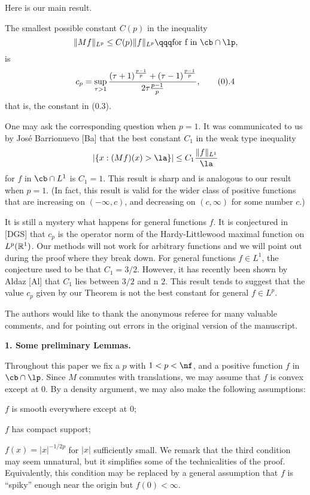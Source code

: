 Here is our main result.

The smallest possible constant $C(p)$ in the inequality
 $$
\|Mf\|_{L^p} \le C(p) \|f\|_{L^p}\qqq \text{for
f in $\cb \cap \lp$},
$$
is
$$
c_p=\sup_{\tau >1} {(\tau +1)^{p-1\over p} + (\tau -1)^{p-1\over p} \over
2\tau {p-1\over p}},\tag0.4
$$
that is, the constant in (0.3).
\endproclaim


One may ask the corresponding question when $p=1$. 
It was communicated to us by Jos\'e  Barrionuevo [Ba] that
the best constant $C_1$ in the weak type inequality
$$
|\{x: (Mf)(x)>\la \}|    \le C_1 { \|f\|_{L^1} \over \la }
$$
for $f$ in   $\cb \cap L^1$ is $C_1=1$. This result is sharp and is
analogous to our result when $p=1$. 
(In fact, this result is valid for the wider class of
positive functions that are increasing on
$(-\infty,c)$, and decreasing on $(c,\infty)$ for some number $c$.)

It is still a mystery what happens for general functions $f$.
It is conjectured in [DGS] that  $c_p$ is the operator norm of
the Hardy-Littlewood maximal function on $L^p(\Bbb R^1)$.
Our methods will not work for arbitrary functions and we  will
point out during the proof where they break down. 
For general functions $f \in L^1$, the conjecture used to be that
$C_1=3/2$.  However, it has recently been shown by Aldaz [Al]
that $C_1$ lies between $3/2$ and n    
$2$.  This result tends to suggest that the value $c_p$ given
by our Theorem is not the best constant for general $f\in L^p$.

The authors would like to thank the anonymous referee for many valuable
comments, and for pointing out errors in the original version of the
manuscript.



\bigskip

{\bf 1. Some preliminary Lemmas.}
\smallskip

Throughout this paper  we fix  a $p$ with $1<p<\nf$, and
a positive function $f$ in
$\cb \cap \lp$. 
Since $M$ commutes with translations, we may assume that
$f$ is convex except at $0$.  By a density argument, 
we may also make the following assumptions:
\roster
\item $f$ is smooth everywhere except at $0$;
\item $f$ has compact support;
\item $f(x) = |x|^{-1/2p}$ for $|x|$ sufficiently small.
\endroster
We remark that the third condition may seem unnatural, but 
it  simplifies some of the technicalities of the proof.
Equivalently, this condition may  be replaced by a  general 
assumption that $f$ is ``spiky'' enough near the origin but $f(0)<\infty$.




